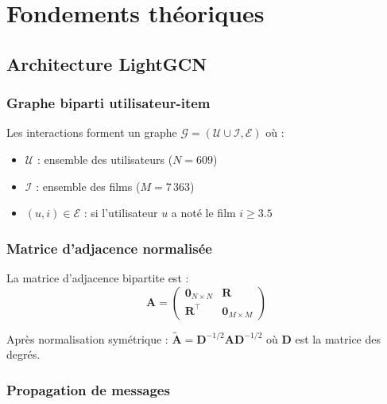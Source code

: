 \documentclass[12pt,a4paper]{report}
\begin{document}
\chapter{Fondements théoriques}

\section{Architecture LightGCN}

\subsection{Graphe biparti utilisateur-item}

Les interactions forment un graphe $\mathcal{G} = (\mathcal{U} \cup \mathcal{I},
\mathcal{E})$ où :
\begin{itemize}
  \item $\mathcal{U}$ : ensemble des utilisateurs ($N = 609$)
  \item $\mathcal{I}$ : ensemble des films ($M = 7\,363$)
  \item $(u,i) \in \mathcal{E}$ : si l'utilisateur $u$ a noté le film $i \geq 3.5$
\end{itemize}

\subsection{Matrice d'adjacence normalisée}

La matrice d'adjacence bipartite est :
\begin{equation}
  \mathbf{A} = \begin{pmatrix} \mathbf{0}_{N\times N} & \mathbf{R} \\
                               \mathbf{R}^\top & \mathbf{0}_{M\times M}
              \end{pmatrix}
\end{equation}

Après normalisation symétrique : $\tilde{\mathbf{A}} = \mathbf{D}^{-1/2}
\mathbf{A} \mathbf{D}^{-1/2}$ où $\mathbf{D}$ est la matrice des degrés.

\subsection{Propagation de messages}
\end{document}
